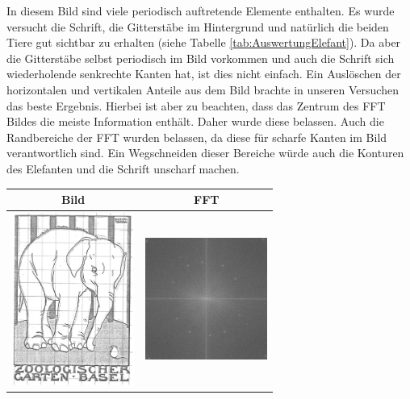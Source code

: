 \documentclass[12pt,german]{article}
\begin{document}
In diesem Bild sind viele periodisch auftretende Elemente enthalten. Es wurde versucht die Schrift, die Gitterstäbe im Hintergrund und natürlich die beiden Tiere gut sichtbar zu erhalten (siehe Tabelle \ref{tab:AuswertungElefant}). Da aber die Gitterstäbe selbst periodisch im Bild vorkommen und auch die Schrift sich wiederholende senkrechte Kanten hat, ist dies nicht einfach. Ein Auslöschen der horizontalen und vertikalen Anteile aus dem Bild brachte in unseren Versuchen das beste Ergebnis. Hierbei ist aber zu beachten, dass das Zentrum des FFT Bildes die meiste Information enthält. Daher wurde diese belassen. Auch die Randbereiche der FFT wurden belassen, da diese für scharfe Kanten im Bild verantwortlich sind. Ein Wegschneiden dieser Bereiche würde auch die Konturen des Elefanten und die Schrift unscharf machen.
\begin{table}[H]
  \centering
  \begin{tabular}{c | c}
    \hline
    Bild & FFT \\
    \hline
	\includegraphics[width=4cm]{../testData/Elefant.jpg} & \includegraphics[width=4cm]{../testData/Results/Elefant/FFT_of_Elefant.jpg} \\
    \hline

\end{tabular}
\end{table}
\end{document}
